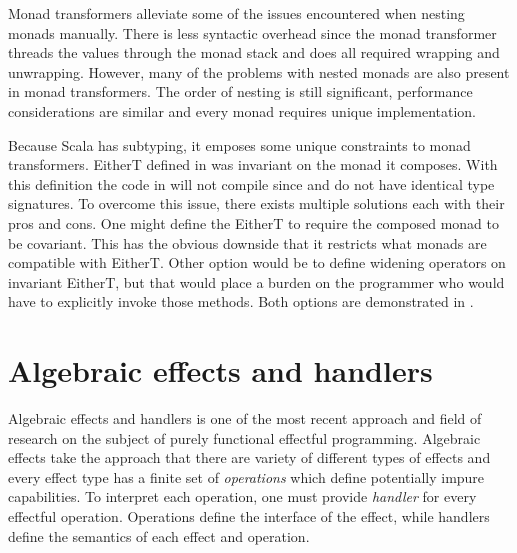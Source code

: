 

Monad transformers alleviate some of the issues encountered when nesting monads manually. There is less syntactic overhead since the monad transformer threads the values through the monad stack and does all required wrapping and unwrapping. However, many of the problems with nested monads are also present in monad transformers. The order of nesting is still significant, performance considerations are similar and every monad requires unique implementation. 

Because Scala has subtyping, it emposes some unique constraints to monad transformers. EitherT defined in  was invariant on the monad it composes. With this definition the code in  will not compile since  and  do not have identical type signatures. To overcome this issue, there exists multiple solutions each with their pros and cons. One might define the EitherT to require the composed monad to be covariant. This has the obvious downside that it restricts what monads are compatible with EitherT. Other option would be to define widening operators on invariant EitherT, but that would place a burden on the programmer who would have to explicitly invoke those methods. Both options are demonstrated in .




\section{Algebraic effects and handlers} \label{background:alg-eff}
Algebraic effects and handlers is one of the most recent approach and field of research on the subject of purely functional effectful programming. Algebraic effects take the approach that there are variety of different types of effects and every effect type has a finite set of \textit{operations} which define potentially impure capabilities. To interpret each operation, one must provide \textit{handler} for every effectful operation. Operations define the interface of the effect, while handlers define the semantics of each effect and operation.

